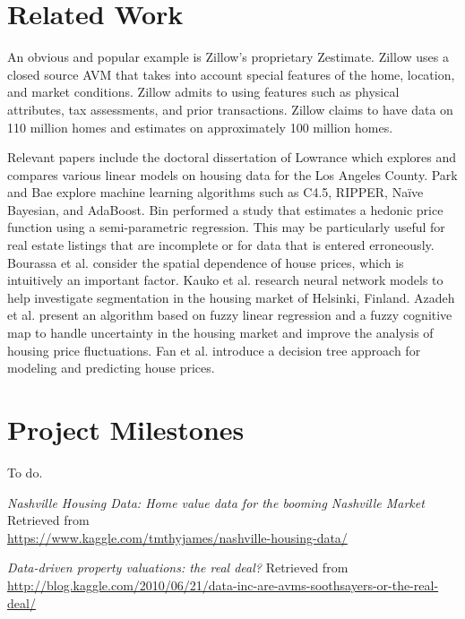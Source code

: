 \documentclass[letter,10pt]{article}
\begin{document}
\begin{multicols}{2}
		\section{Related Work}
		An obvious and popular example is Zillow's proprietary Zestimate\textsuperscript{\textregistered}. Zillow uses a closed source AVM that takes into account special features of the home, location, and market conditions. Zillow admits to using features such as physical attributes, tax assessments, and prior transactions. Zillow claims to have data on 110 million homes and estimates on approximately 100 million homes.\textsuperscript{\cite{zillow}}
		\par
		Relevant papers include the doctoral dissertation of Lowrance which explores and compares various linear models on housing data for the Los Angeles County.\textsuperscript{\cite{lowrance}} Park and Bae explore machine learning algorithms such as C4.5, RIPPER, Naïve Bayesian, and AdaBoost.\textsuperscript{\cite{park}} Bin performed a study that estimates a hedonic price function using a semi-parametric regression.\textsuperscript{\cite{bin}} This may be particularly useful for real estate listings that are incomplete or for data that is entered erroneously. Bourassa et al. consider the spatial dependence of house prices, which is intuitively an important factor.\textsuperscript{\cite{bourassa1}\cite{bourassa2}} Kauko et al. research neural network models to help investigate segmentation in the housing market of Helsinki, Finland.\textsuperscript{\cite{kauko}} Azadeh et al. present an algorithm based on fuzzy linear regression and a fuzzy cognitive map to handle uncertainty in the housing market and improve the analysis of housing price fluctuations.\textsuperscript{\cite{azadeh}} Fan et al. introduce a decision tree approach for modeling and predicting house prices.\textsuperscript{\cite{fan}}
		\section{Project Milestones}
		To do.
		\par

		\begin{thebibliography}{9}
			\textit{Nashville Housing Data: Home value data for the booming Nashville Market}
			Retrieved from \\ \small{\url{https://www.kaggle.com/tmthyjames/nashville-housing-data/}}
			
			\textit{Data-driven property valuations: the real deal?}
			Retrieved from \\ \small{\url{http://blog.kaggle.com/2010/06/21/data-inc-are-avms-soothsayers-or-the-real-deal/}}
			

\end{thebibliography}
\end{multicols}
\end{document}
